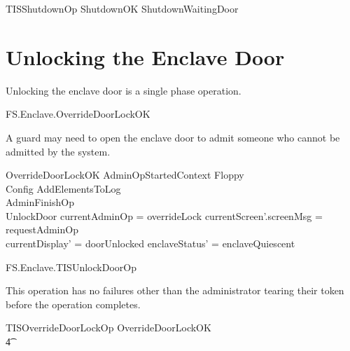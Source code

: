 \begin{zed}
        TISShutdownOp  ShutdownOK \lor ShutdownWaitingDoor
\end{zed}

\section{Unlocking the Enclave Door}

Unlocking the enclave door is a single phase operation.

\begin{traceunit}{FS.Enclave.OverrideDoorLockOK}
\end{traceunit}

A guard may need to open the enclave door to admit someone who cannot
be admitted by the system.

\begin{schema}{OverrideDoorLockOK}
        AdminOpStartedContext
\also   
        \Xi Floppy
\\      \Xi Config
\also
        AddElementsToLog
\\      AdminFinishOp
\\      UnlockDoor
\where
        \The currentAdminOp = overrideLock
\also
        currentScreen'.screenMsg = requestAdminOp
\\      currentDisplay' = doorUnlocked
\also
        enclaveStatus' = enclaveQuiescent
\end{schema}

\begin{traceunit}{FS.Enclave.TISUnlockDoorOp}
\end{traceunit}

This operation has no failures other
than the administrator tearing their token before the operation completes.

\begin{zed}
        TISOverrideDoorLockOp  OverrideDoorLockOK
\\ \t4  \lor
        [~ BadAdminLogout | enclaveStatus = waitingStartAdminOp 
\\ \t6  \land \The currentAdminOp = overrideLock     ~]
\end{zed}


